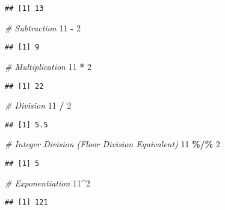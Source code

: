 \documentclass[
]{book}
\newenvironment{Shaded}{\begin{snugshade}}{\end{snugshade}}
\newcommand{\CommentTok}[1]{\textcolor[rgb]{0.56,0.35,0.01}{\textit{#1}}}
\newcommand{\DecValTok}[1]{\textcolor[rgb]{0.00,0.00,0.81}{#1}}
\newcommand{\SpecialCharTok}[1]{\textcolor[rgb]{0.81,0.36,0.00}{\textbf{#1}}}
\theoremstyle{definition}
\theoremstyle{definition}
\theoremstyle{definition}
\theoremstyle{definition}
\theoremstyle{remark}
\begin{document}
\begin{verbatim}
## [1] 13
\end{verbatim}

\begin{Shaded}
\begin{Highlighting}[]
\CommentTok{\# Subtraction}
\DecValTok{11} \SpecialCharTok{{-}} \DecValTok{2}  
\end{Highlighting}
\end{Shaded}

\begin{verbatim}
## [1] 9
\end{verbatim}

\begin{Shaded}
\begin{Highlighting}[]
\CommentTok{\# Multiplication}
\DecValTok{11} \SpecialCharTok{*} \DecValTok{2}
\end{Highlighting}
\end{Shaded}

\begin{verbatim}
## [1] 22
\end{verbatim}

\begin{Shaded}
\begin{Highlighting}[]
\CommentTok{\# Division}
\DecValTok{11} \SpecialCharTok{/} \DecValTok{2}
\end{Highlighting}
\end{Shaded}

\begin{verbatim}
## [1] 5.5
\end{verbatim}

\begin{Shaded}
\begin{Highlighting}[]
\CommentTok{\# Integer Division (Floor Division Equivalent)}
\DecValTok{11} \SpecialCharTok{\%/\%} \DecValTok{2}
\end{Highlighting}
\end{Shaded}

\begin{verbatim}
## [1] 5
\end{verbatim}

\begin{Shaded}
\begin{Highlighting}[]
\CommentTok{\# Exponentiation}
\DecValTok{11}\SpecialCharTok{\^{}}\DecValTok{2}
\end{Highlighting}
\end{Shaded}

\begin{verbatim}
## [1] 121
\end{verbatim}
\end{document}
